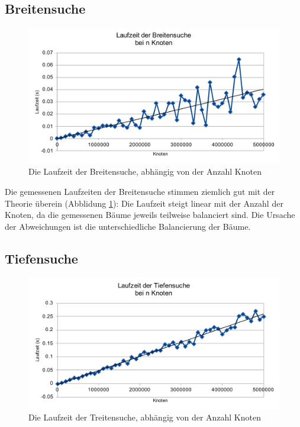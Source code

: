 \documentclass[a4paper,11pt]{article}
\begin{document}
\subsection{Breitensuche}
	\begin{figure}[!htb]
		\centering
		\includegraphics[width=0.85\linewidth]{img/BFS_size.pdf}
		\caption{Die Laufzeit der Breitensuche, abhängig von der Anzahl Knoten}
		\label{fig:bfs_time}
	\end{figure}
	
Die gemessenen Laufzeiten der Breitensuche stimmen ziemlich gut mit der Theorie überein (Abblidung \ref{fig:bfs_time}): Die Laufzeit steigt linear mit der Anzahl der Knoten, da die gemessenen Bäume jeweils teilweise balanciert sind. Die Ursache der Abweichungen ist die unterschiedliche Balancierung der Bäume.
\subsection{Tiefensuche}

	\begin{figure}[!htb]
		\centering
		\includegraphics[width=0.85\linewidth]{img/DFS_size.pdf}
		\caption{Die Laufzeit der Treitensuche, abhängig von der Anzahl Knoten}
		\label{fig:dfs_time}
	\end{figure}
	
\end{document}
